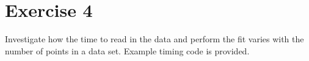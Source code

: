 \chapter{Exercise 4}
\label{chap:4}

Investigate how the time to read in the data and perform the fit varies with
the number of points in a data set. Example timing code is provided.